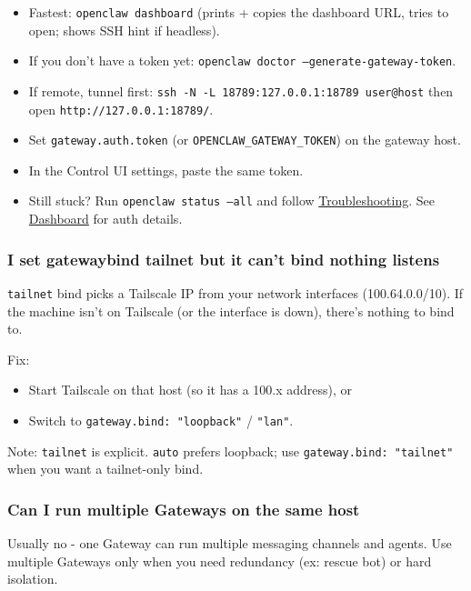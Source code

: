 \begin{itemize}
  \item Fastest: \texttt{openclaw dashboard} (prints + copies the dashboard URL, tries to open; shows SSH hint if headless).
  \item If you don't have a token yet: \texttt{openclaw doctor --generate-gateway-token}.
  \item If remote, tunnel first: \texttt{ssh -N -L 18789:127.0.0.1:18789 user@host} then open \texttt{http://127.0.0.1:18789/}.
  \item Set \texttt{gateway.auth.token} (or \texttt{OPENCLAW\_GATEWAY\_TOKEN}) on the gateway host.
  \item In the Control UI settings, paste the same token.
  \item Still stuck? Run \texttt{openclaw status --all} and follow \href{/gateway/troubleshooting}{Troubleshooting}. See \href{/web/dashboard}{Dashboard} for auth details.
\end{itemize}


\subsubsection{I set gatewaybind tailnet but it can't bind nothing listens}


\texttt{tailnet} bind picks a Tailscale IP from your network interfaces (100.64.0.0/10). If the machine isn't on Tailscale (or the interface is down), there's nothing to bind to.

Fix:

\begin{itemize}
  \item Start Tailscale on that host (so it has a 100.x address), or
  \item Switch to \texttt{gateway.bind: "loopback"} / \texttt{"lan"}.
\end{itemize}


Note: \texttt{tailnet} is explicit. \texttt{auto} prefers loopback; use \texttt{gateway.bind: "tailnet"} when you want a tailnet-only bind.

\subsubsection{Can I run multiple Gateways on the same host}


Usually no - one Gateway can run multiple messaging channels and agents. Use multiple Gateways only when you need redundancy (ex: rescue bot) or hard isolation.

